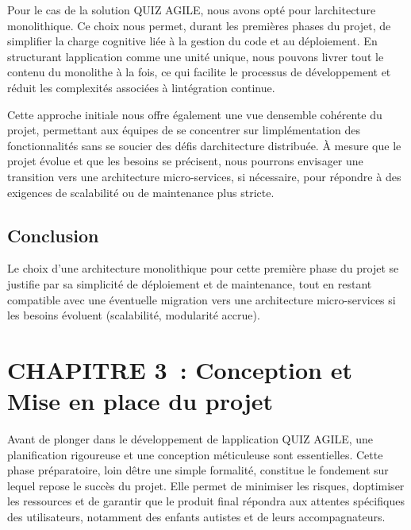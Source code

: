 \documentclass[12pt,a4paper,twoside]{report}
\begin{document}
Pour le cas de la solution QUIZ AGILE, nous avons opté pour
l\textquotesingle architecture monolithique. Ce choix nous permet,
durant les premières phases du projet, de simplifier la charge cognitive
liée à la gestion du code et au déploiement. En structurant
l\textquotesingle application comme une unité unique, nous pouvons
livrer tout le contenu du monolithe à la fois, ce qui facilite le
processus de développement et réduit les complexités associées à
l\textquotesingle intégration continue.

Cette approche initiale nous offre également une vue
d\textquotesingle ensemble cohérente du projet, permettant aux équipes
de se concentrer sur l\textquotesingle implémentation des
fonctionnalités sans se soucier des défis d\textquotesingle architecture
distribuée. À mesure que le projet évolue et que les besoins se
précisent, nous pourrons envisager une transition vers une architecture
micro-services, si nécessaire, pour répondre à des exigences de
scalabilité ou de maintenance plus stricte.

\hypertarget{conclusion-1}{%
\subsection{Conclusion~}\label{conclusion-1}}

Le choix d'une architecture monolithique pour cette première phase du
projet se justifie par sa simplicité de déploiement et de maintenance,
tout en restant compatible avec une éventuelle migration vers une
architecture micro-services si les besoins évoluent (scalabilité,
modularité accrue).

\hypertarget{section-3}{%
\section{}\label{section-3}}

\hypertarget{chapitre-3-conception-et-mise-en-place-du-projet}{%
\section{CHAPITRE 3~: Conception et Mise en place du
projet}\label{chapitre-3-conception-et-mise-en-place-du-projet}}

Avant de plonger dans le développement de l\textquotesingle application
QUIZ AGILE, une planification rigoureuse et une conception méticuleuse
sont essentielles. Cette phase préparatoire, loin d\textquotesingle être
une simple formalité, constitue le fondement sur lequel repose le succès
du projet. Elle permet de minimiser les risques,
d\textquotesingle optimiser les ressources et de garantir que le produit
final répondra aux attentes spécifiques des utilisateurs, notamment des
enfants autistes et de leurs accompagnateurs.
\end{document}
